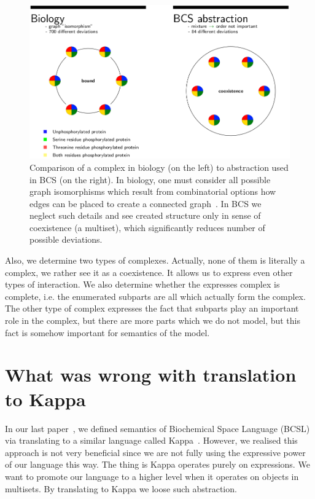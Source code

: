 \documentclass[12pt]{fithesis2}
\begin{document}
\begin{figure}[!h]
\begin{center}
  \includegraphics[scale=0.35]{pics/abstraction}
\end{center}
\caption{Comparison of a complex in biology (on the left) to abstraction used in BCS (on the right). In biology, one must consider all possible graph isomorphisms which result from combinatorial options how edges can be placed to create a connected graph~\cite{Chartrand1985}. In BCS we neglect such details and see created structure only in sense of coexistence (a multiset), which significantly reduces number of possible deviations.}\label{abstraction_comparision}
\end{figure}

Also, we determine two types of complexes. Actually, none of them is literally a complex, we rather see it as a coexistence. It allows us to express even other types of interaction. We also determine whether the expresses complex is complete, i.e. the enumerated subparts are all which actually form the complex. The other type of complex expresses the fact that subparts play an important role in the complex, but there are more parts which we do not model, but this fact is somehow important for semantics of the model.

\section{What was wrong with translation to Kappa}
\label{why_not_kappa}

In our last paper~\cite{Ded201627}, we defined semantics of Biochemical Space Language (BCSL) via translating to a similar language called Kappa~\cite{kappa_formal}. However, we realised this approach is not very beneficial since we are not fully using the expressive power of our language this way. The thing is Kappa operates purely on expressions. We want to promote our language to a higher level when it operates on objects in multisets. By translating to Kappa we loose such abstraction. 
\end{document}
